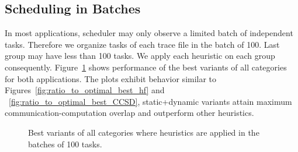 \documentclass[runningheads]{llncs} %
\begin{document}
\subsection{Scheduling in Batches}
In most applications, scheduler may only observe a limited batch of independent tasks. Therefore we organize tasks of each trace file in the batch of 100. Last group may have less than 100 tasks. We  apply each heuristic on each group consequently.  Figure~\ref{fig:best_variants_batch} shows performance of the best variants of all categories for both applications. The plots exhibit behavior similar to Figures~\ref{fig:ratio_to_optimal_best_hf} and ~\ref{fig:ratio_to_optimal_best_CCSD}, static+dynamic variants attain maximum communication-computation overlap and outperform other heuristics.


 \begin{figure}[htb]
	\caption{Best variants of all categories where heuristics are applied in the batches of 100 tasks.}
	\label{fig:best_variants_batch}
 \end{figure}

\end{document}
